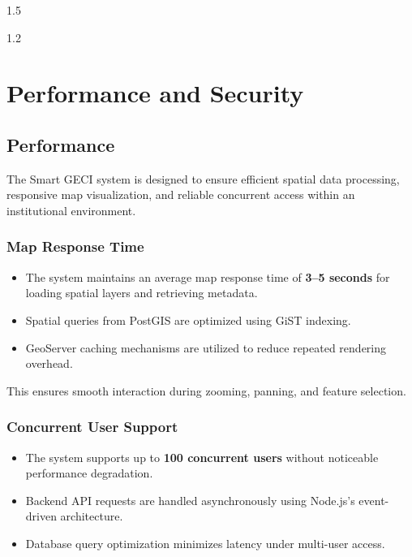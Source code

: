 
\newpage
\thispagestyle{empty}
%
\begin{spacing}{1.5}
%


\end{spacing}
\newpage

\thispagestyle{empty}
%
\begin{spacing}{1.2}
%

\chapter{Performance and Security}

\section{Performance}

The Smart GECI system is designed to ensure efficient spatial data processing,
responsive map visualization, and reliable concurrent access within an institutional
environment.

\subsection*{Map Response Time}

\begin{itemize}
    \item The system maintains an average map response time of \textbf{3–5 seconds}
    for loading spatial layers and retrieving metadata.
    \item Spatial queries from PostGIS are optimized using GiST indexing.
    \item GeoServer caching mechanisms are utilized to reduce repeated rendering
    overhead.
\end{itemize}

This ensures smooth interaction during zooming, panning, and feature selection.

\subsection*{Concurrent User Support}

\begin{itemize}
    \item The system supports up to \textbf{100 concurrent users} without noticeable
    performance degradation.
    \item Backend API requests are handled asynchronously using Node.js’s
    event-driven architecture.
    \item Database query optimization minimizes latency under multi-user access.
\end{itemize}


\end{spacing}
